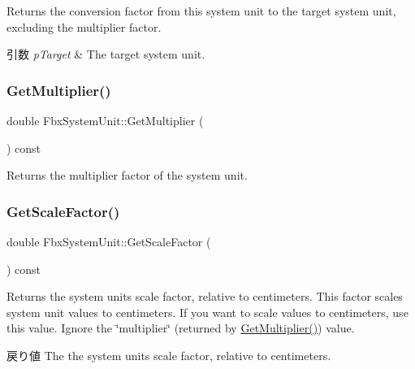 Returns the conversion factor from this system unit to the target system unit, excluding the multiplier factor. 
\begin{DoxyParams}{引数}
{\em p\+Target} & The target system unit. \\
\hline
\end{DoxyParams}
\mbox{\label{class_fbx_system_unit_ab9b59b5de500d63e0ef832818948a024}} 
\subsubsection{\texorpdfstring{Get\+Multiplier()}{GetMultiplier()}}
{\footnotesize\ttfamily double Fbx\+System\+Unit\+::\+Get\+Multiplier (\begin{DoxyParamCaption}{ }\end{DoxyParamCaption}) const}

Returns the multiplier factor of the system unit. \mbox{\label{class_fbx_system_unit_a9421294bb5936de827e0a9b8472f6095}} 
\subsubsection{\texorpdfstring{Get\+Scale\+Factor()}{GetScaleFactor()}}
{\footnotesize\ttfamily double Fbx\+System\+Unit\+::\+Get\+Scale\+Factor (\begin{DoxyParamCaption}{ }\end{DoxyParamCaption}) const}

Returns the system unit\textquotesingle{}s scale factor, relative to centimeters. This factor scales system unit values to centimeters. If you want to scale values to centimeters, use this value. Ignore the \char`\"{}multiplier\char`\"{} (returned by \hyperlink{class_fbx_system_unit_ab9b59b5de500d63e0ef832818948a024}{Get\+Multiplier()}) value. \begin{DoxyReturn}{戻り値}
The the system unit\textquotesingle{}s scale factor, relative to centimeters. 
\end{DoxyReturn}
\mbox{\label{class_fbx_system_unit_a8c8481b9936bc2fa9320b29c7a1a4ff5}} 
